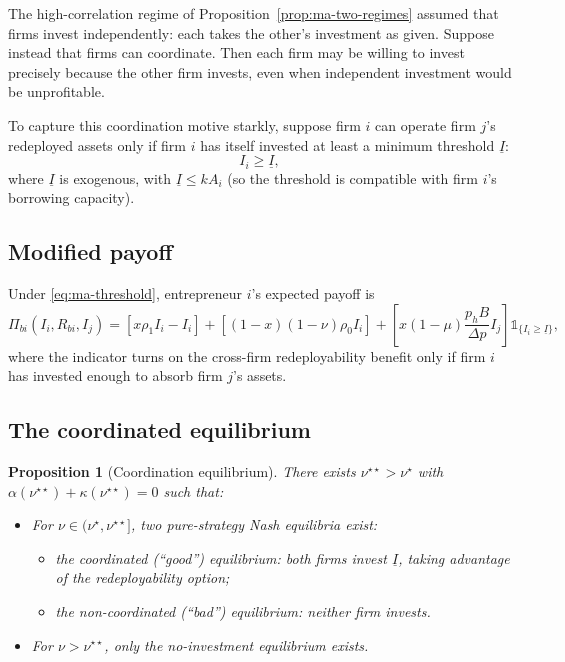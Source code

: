 \documentclass[11pt,a4paper,oneside]{book}
\def\leq{\leqslant}
\def\geq{\geqslant}
\theoremstyle{plain}
\newtheorem{proposition}[theorem]{Proposition}
\theoremstyle{definition}
\theoremstyle{remark}
\numberwithin{equation}{chapter}
\begin{document}
The high-correlation regime of Proposition~\ref{prop:ma-two-regimes} assumed that firms invest independently: each takes the other's investment as given.
Suppose instead that firms can coordinate.
Then each firm may be willing to invest precisely because the other firm invests, even when independent investment would be unprofitable.

To capture this coordination motive starkly, suppose firm $i$ can operate firm $j$'s redeployed assets only if firm $i$ has itself invested at least a minimum threshold $\underline{I}$:
\begin{equation}\label{eq:ma-threshold}
  I_i \geq \underline{I},
\end{equation}
where $\underline{I}$ is exogenous, with $\underline{I} \leq k A_i$ (so the threshold is compatible with firm $i$'s borrowing capacity).

\subsection{Modified payoff}

Under \eqref{eq:ma-threshold}, entrepreneur $i$'s expected payoff is
\begin{equation}\label{eq:ma-Pi-coord}
  \Pi_{b i}(I_i, R_{b i}, I_j) = [x \rho_1 I_i - I_i] + [(1 - x)(1 - \nu) \rho_0 I_i] + \left[x(1 - \mu) \frac{p_h B}{\Delta p} I_j\right] \mathbb{1}_{\{I_i \geq \underline{I}\}},
\end{equation}
where the indicator turns on the cross-firm redeployability benefit only if firm $i$ has invested enough to absorb firm $j$'s assets.

\subsection{The coordinated equilibrium}

\begin{proposition}[Coordination equilibrium]\label{prop:ma-coord}
There exists $\nu^{\star\star} > \nu^\star$ with $\alpha(\nu^{\star\star}) + \kappa(\nu^{\star\star}) = 0$ such that:
\begin{itemize}
  \item For $\nu \in (\nu^\star, \nu^{\star\star}]$, \emph{two} pure-strategy Nash equilibria exist:
  \begin{itemize}
    \item the \emph{coordinated} (``good'') equilibrium: both firms invest $\underline{I}$, taking advantage of the redeployability option;
    \item the \emph{non-coordinated} (``bad'') equilibrium: neither firm invests.
  \end{itemize}
  \item For $\nu > \nu^{\star\star}$, only the no-investment equilibrium exists.
\end{itemize}
\end{proposition}
\end{document}
